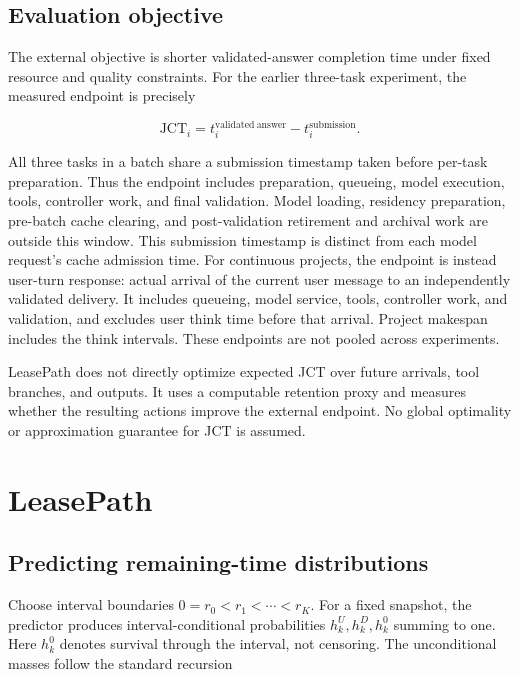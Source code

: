 \documentclass[sigconf, screen, review, balance=false]{acmart}
\begin{document}
\subsection{Evaluation objective}\label{evaluation-objective}

The external objective is shorter validated-answer completion time under
fixed resource and quality constraints. For the earlier three-task experiment,
the measured endpoint is precisely

\[
\mathrm{JCT}_i=t_i^{\mathrm{validated\ answer}}-t_i^{\mathrm{submission}}.
\]

All three tasks in a batch share a submission timestamp taken before
per-task preparation. Thus the endpoint includes preparation, queueing,
model execution, tools, controller work, and final validation. Model
loading, residency preparation, pre-batch cache clearing, and
post-validation retirement and archival work are outside this window.
This submission timestamp is distinct from each model request's cache
admission time. For continuous projects, the endpoint is instead
user-turn response: actual arrival of the current user message to an
independently validated delivery. It includes queueing, model service,
tools, controller work, and validation, and excludes user think time
before that arrival. Project makespan includes the think intervals.
These endpoints are not pooled across experiments.

LeasePath does not directly optimize expected JCT over future arrivals,
tool branches, and outputs. It uses a computable retention proxy and
measures whether the resulting actions improve the external endpoint. No
global optimality or approximation guarantee for JCT is assumed.

\section{LeasePath}\label{leasepath}




\subsection{Predicting remaining-time
distributions}\label{predicting-remaining-time-distributions}

Choose interval boundaries \(0=r_0<r_1<\cdots<r_K\). For a fixed
snapshot, the predictor produces interval-conditional probabilities
\(h_k^U,h_k^D,h_k^0\) summing to one. Here \(h_k^0\) denotes survival
through the interval, not censoring. The unconditional masses follow the
standard recursion
\end{document}
